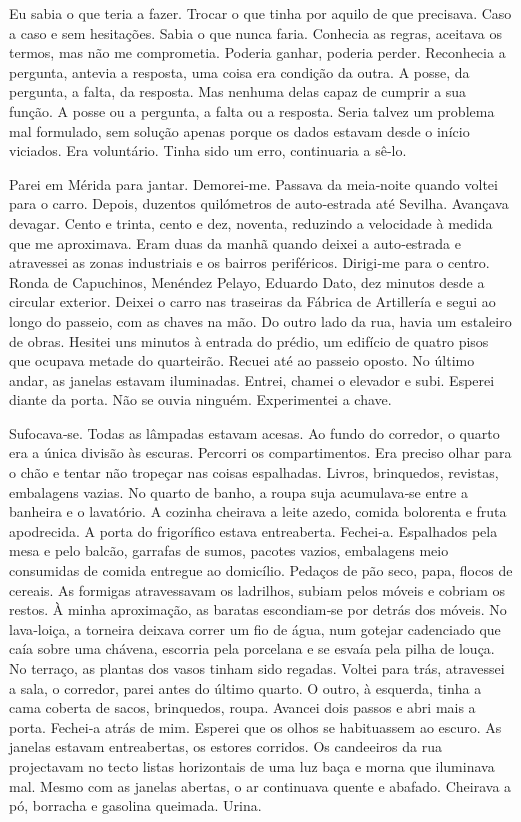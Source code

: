 Eu sabia o que teria a fazer. Trocar o que tinha por aquilo de que
precisava. Caso a caso e sem hesitações. Sabia o que nunca faria.
Conhecia as regras, aceitava os termos, mas não me comprometia. Poderia
ganhar, poderia perder. Reconhecia a pergunta, antevia a resposta, uma
coisa era condição da outra. A posse, da pergunta, a falta, da resposta.
Mas nenhuma delas capaz de cumprir a sua função. A posse ou a pergunta,
a falta ou a resposta. Seria talvez um problema mal formulado, sem
solução apenas porque os dados estavam desde o início viciados. Era
voluntário. Tinha sido um erro, continuaria a sê­‑lo.

Parei em Mérida para jantar. Demorei­‑me. Passava da meia­‑noite quando
voltei para o carro. Depois, duzentos quilómetros de auto­‑estrada até
Sevilha. Avançava devagar. Cento e trinta, cento e dez, noventa,
reduzindo a velocidade à medida que me aproximava. Eram duas da manhã
quando deixei a auto­‑estrada e atravessei as zonas industriais e os
bairros periféricos. Dirigi­‑me para o centro. Ronda de Capuchinos,
Menéndez Pelayo, Eduardo Dato, dez minutos desde a circular exterior.
Deixei o carro nas traseiras da Fábrica de Artillería e segui ao longo
do passeio, com as chaves na mão. Do outro lado da rua, havia um
estaleiro de obras. Hesitei uns minutos à entrada do prédio, um edifício
de quatro pisos que ocupava metade do quarteirão. Recuei até ao passeio
oposto. No último andar, as janelas estavam iluminadas. Entrei, chamei o
elevador e subi. Esperei diante da porta. Não se ouvia ninguém.
Experimentei a chave.

Sufocava­‑se. Todas as lâmpadas estavam acesas. Ao fundo do corredor, o
quarto era a única divisão às escuras. Percorri os compartimentos. Era
preciso olhar para o chão e tentar não tropeçar nas coisas espalhadas.
Livros, brinquedos, revistas, embalagens vazias. No quarto de banho, a
roupa suja acumulava­‑se entre a banheira e o lavatório. A cozinha
cheirava a leite azedo, comida bolorenta e fruta apodrecida. A porta do
frigorífico estava entreaberta. Fechei­‑a. Espalhados pela mesa e pelo
balcão, garrafas de sumos, pacotes vazios, embalagens meio consumidas de
comida entregue ao domicílio. Pedaços de pão seco, papa, flocos de
cereais. As formigas atravessavam os ladrilhos, subiam pelos móveis e
cobriam os restos. À minha aproximação, as baratas escondiam­‑se por
detrás dos móveis. No lava­‑loiça, a torneira deixava correr um fio de
água, num gotejar cadenciado que caía sobre uma chávena, escorria pela
porcelana e se esvaía pela pilha de louça. No terraço, as plantas dos
vasos tinham sido regadas. Voltei para trás, atravessei a sala, o
corredor, parei antes do último quarto. O outro, à esquerda, tinha a
cama coberta de sacos, brinquedos, roupa. Avancei dois passos e abri
mais a porta. Fechei­‑a atrás de mim. Esperei que os olhos se
habituassem ao escuro. As janelas estavam entreabertas, os estores
corridos. Os candeeiros da rua projectavam no tecto listas horizontais
de uma luz baça e morna que iluminava mal. Mesmo com as janelas abertas,
o ar continuava quente e abafado. Cheirava a pó, borracha e gasolina
queimada. Urina.

